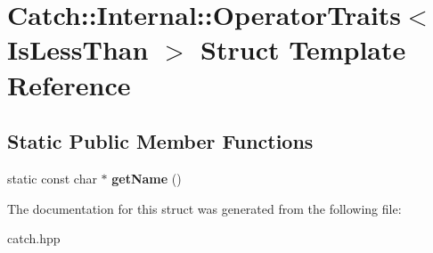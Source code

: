\hypertarget{struct_catch_1_1_internal_1_1_operator_traits_3_01_is_less_than_01_4}{}\section{Catch\+:\+:Internal\+:\+:Operator\+Traits$<$ Is\+Less\+Than $>$ Struct Template Reference}
\label{struct_catch_1_1_internal_1_1_operator_traits_3_01_is_less_than_01_4}
\subsection*{Static Public Member Functions}
\begin{DoxyCompactItemize}
\item 
\mbox{\label{struct_catch_1_1_internal_1_1_operator_traits_3_01_is_less_than_01_4_aa3b536ddbd2e34b1253931ff00c32712}} 
static const char $\ast$ {\bfseries get\+Name} ()
\end{DoxyCompactItemize}


The documentation for this struct was generated from the following file\+:\begin{DoxyCompactItemize}
\item 
catch.\+hpp\end{DoxyCompactItemize}
